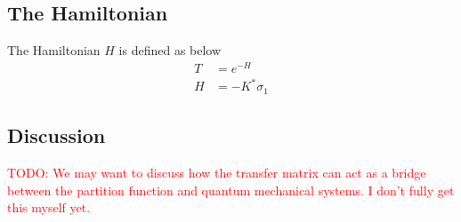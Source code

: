\documentclass[book.tex]{subfiles}
\begin{document}
\subsection{The Hamiltonian}

The Hamiltonian $H$ is defined as 
below
\begin{align}
    T &= e^{-H}\\
    H &= -K^* \sigma_1
\end{align}

\subsection{Discussion}

\textcolor{red}{TODO: We may want to discuss how the transfer matrix can act as a bridge between the partition function and quantum mechanical systems. I don't fully get this myself yet.}
\end{document}
